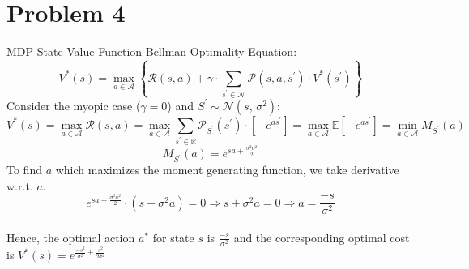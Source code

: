 \documentclass{article}
\begin{document}
\section*{Problem 4}
MDP State-Value Function Bellman Optimality Equation:
$$
V^{*}(s)=\max _{a \in \mathcal{A}}\left\{\mathcal{R}(s, a)+\gamma \cdot \sum_{s^{\prime} \in \mathcal{N}} \mathcal{P}\left(s, a, s^{\prime}\right) \cdot V^{*}\left(s^{\prime}\right)\right\}
$$
Consider the myopic case ($\gamma = 0$) and $S^{\prime}\sim \mathcal{N}(s,\,\sigma^{2})$:
$$
V^{*}(s)=\max _{a \in \mathcal{A}}\mathcal{R}(s, a) = \max _{a \in \mathcal{A}}\sum_{s^{\prime} \in \mathbb{R}} \mathcal{P}_{S^{\prime}}\left( s^{\prime}\right)\cdot [-e ^{as^{\prime}}] = \max _{a \in \mathcal{A}}\mathbb{E}[-e^{as^{\prime}}] = \min _{a \in \mathcal{A}} M_{S^{\prime}}(a)
$$
$$
 M_{S^{\prime}}(a)=e^{sa+\frac{\sigma^2 a^2}{2}}
$$
To find $a$ which maximizes the moment generating function, we take derivative w.r.t. $a$.\\
$$
 e^{sa+\frac{\sigma^2 a^2}{2}}\cdot (s + \sigma^2 a) = 0 \Longrightarrow s + \sigma^2 a = 0 \Longrightarrow a = \frac{-s}{\sigma^2}
$$\\
Hence, the optimal action $a^{*}$ for state $s$ is $\frac{-s}{\sigma^2}$ and the corresponding optimal cost is $V^{*}(s) = e^{\frac{-s^2}{\sigma^2} + \frac{s^2}{2\sigma^2}}$
\end{document}
